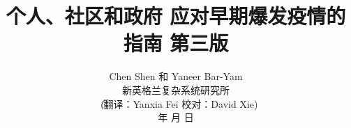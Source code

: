 \documentclass[onecolumn,journal]{IEEEtran}
\begin{document}
\title{\color{Brown}  个人、社区和政府 \linebreak 应对早期爆发疫情的指南 第三版 \\
\vspace{-0.35ex}}
\author{Chen Shen 和 Yaneer Bar-Yam \\ 新英格兰复杂系统研究所 \\
\vspace{+0.35ex}
\small{\textit（{翻译：Yanxia Fei 校对：David Xie})}\\
  年   月  日
  \vspace{-8ex} \\
\textbf{}
 }

\maketitle




\thispagestyle{empty} %




\end{document}
